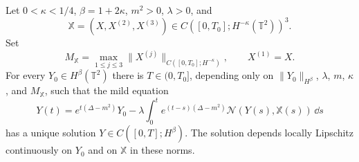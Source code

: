 \begin{theorem}
\label{thm:spde-dpd-deterministic-local-fixed-point}
Let \(0<\kappa<1/4\), \(\beta=1+2\kappa\), \(m^2>0\), \(\lambda>0\), and
\[
  \mathbb X=(X,X^{(2)},X^{(3)})\in C([0,T_0];H^{-\kappa}(\mathbb T^2))^3 .
\]
Set
\[
  M_{\mathbb X}
  =
  \max_{1\leq j\leq3}
  \|X^{(j)}\|_{C([0,T_0];H^{-\kappa})},
  \qquad X^{(1)}=X .
\]
For every \(Y_0\in H^\beta(\mathbb T^2)\) there is
\(T\in(0,T_0]\), depending only on
\(\|Y_0\|_{H^\beta}\), \(\lambda\), \(m\), \(\kappa\), and \(M_{\mathbb X}\),
such that the mild equation
\begin{equation}
  Y(t)
  =
  e^{t(\Delta-m^2)}Y_0
  -
  \lambda\int_0^t
  e^{(t-s)(\Delta-m^2)}
  \mathcal N(Y(s),\mathbb X(s))\,\dd s
  \label{eq:spde-dpd-mild-fixed-point}
\end{equation}
has a unique solution \(Y\in C([0,T];H^\beta)\).  The solution depends
locally Lipschitz continuously on \(Y_0\) and on \(\mathbb X\) in these
norms.
\end{theorem}


